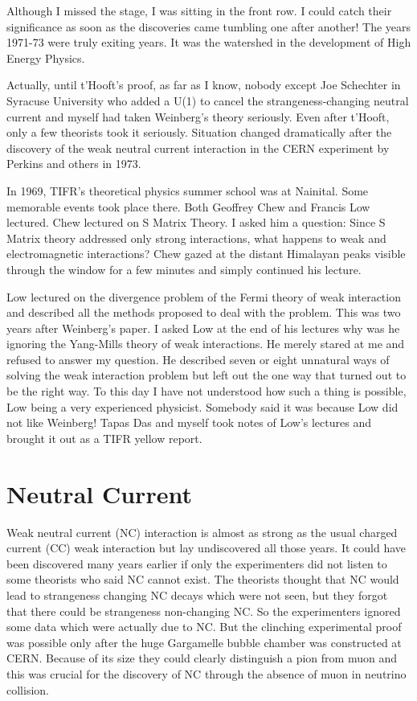 Although I missed the stage, I was sitting in the front row. I could 
catch their significance as soon as the discoveries came tumbling one 
after another! The years 1971-73 were truly exiting years. It was the 
watershed in the development of High Energy Physics.
  
Actually, until t'Hooft's proof, as far as I know, nobody except Joe 
Schechter in Syracuse University who added a U(1) to cancel the 
strangeness-changing neutral current and myself had taken Weinberg's 
theory seriously. Even after t'Hooft, only a few theorists took it 
seriously. Situation changed dramatically after the discovery of the 
weak neutral current interaction in the CERN experiment by Perkins and 
others in 1973.

In 1969, TIFR's theoretical physics summer school was at Nainital. Some 
memorable events took place there. Both Geoffrey Chew and Francis Low 
lectured. Chew lectured on S Matrix Theory. I asked him a question: 
Since S Matrix theory addressed only strong interactions, what happens 
to weak and electromagnetic interactions? Chew gazed at the distant 
Himalayan peaks visible through the window for a few minutes and simply 
continued his lecture.

Low lectured on the divergence problem of the Fermi theory of weak 
interaction and described all the methods proposed to deal with the 
problem. This was two years after Weinberg's paper. I asked Low at the 
end of his lectures why was he ignoring the Yang-Mills theory of weak 
interactions. He merely stared at me and refused to answer my question. 
He described seven or eight unnatural ways of solving the weak 
interaction problem but left out the one way that turned out to be the 
right way. To this day I have not understood how such a thing is 
possible, Low being a very experienced physicist. Somebody said it was 
because Low did not like Weinberg! Tapas Das and myself took notes of 
Low's lectures and brought it out as a TIFR yellow report.

\section*{Neutral Current}
Weak neutral current (NC) interaction is almost as strong as the usual 
charged current (CC) weak interaction but lay undiscovered all those 
years. It could have been discovered many years earlier if only the 
experimenters did not listen to some theorists who said NC cannot exist. 
The theorists thought that NC would lead to strangeness changing NC 
decays which were not seen, but they forgot that there could be 
strangeness non-changing NC. So the experimenters ignored some data which 
were actually due to NC. But the clinching experimental proof was 
possible only after the huge Gargamelle bubble chamber was constructed 
at CERN. Because of its size they could clearly distinguish a pion 
from muon and this was crucial for the discovery of NC through the 
absence of muon in neutrino collision.
\smallskip

